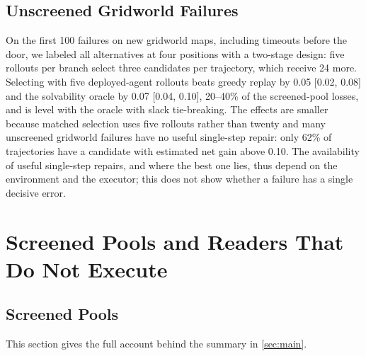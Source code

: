 \documentclass{article}
\theoremstyle{plain}
\theoremstyle{definition}
\theoremstyle{remark}
\begin{document}
\subsection{Unscreened Gridworld Failures}
\label{app:gridpool}

On the first 100 failures on new gridworld maps, including timeouts before the door, we labeled all alternatives at four positions with a two-stage design: five rollouts per branch select three candidates per trajectory, which receive 24 more. Selecting with five deployed-agent rollouts beats greedy replay by 0.05 [0.02, 0.08] and the solvability oracle by 0.07 [0.04, 0.10], 20--40\% of the screened-pool losses, and is level with the oracle with slack tie-breaking. The effects are smaller because matched selection uses five rollouts rather than twenty and many unscreened gridworld failures have no useful single-step repair: only 62\% of trajectories have a candidate with estimated net gain above 0.10. The availability of useful single-step repairs, and where the best one lies, thus depend on the environment and the executor; this does not show whether a failure has a single decisive error.

\section{Screened Pools and Readers That Do Not Execute}
\label{app:readers}

\subsection{Screened Pools}
\label{app:screened}

This section gives the full account behind the summary in \cref{sec:main}.
\end{document}
